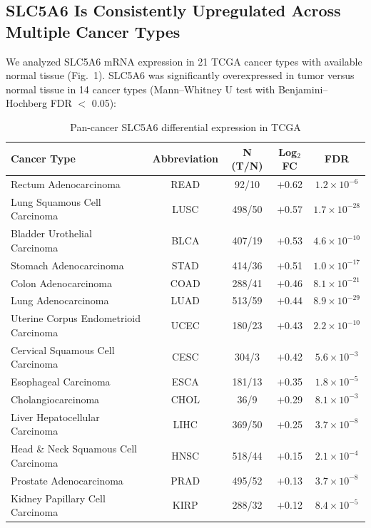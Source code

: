 \documentclass[pdflatex,sn-nature]{sn-jnl}
\begin{document}
\subsection*{SLC5A6 Is Consistently Upregulated Across Multiple Cancer Types}

We analyzed SLC5A6 mRNA expression in 21 TCGA cancer types with available normal tissue (Fig.~1). SLC5A6 was significantly overexpressed in tumor versus normal tissue in 14 cancer types (Mann--Whitney U test with Benjamini--Hochberg FDR $<$ 0.05):

\begin{table}[t]
\centering
\caption{Pan-cancer SLC5A6 differential expression in TCGA}
\label{tab:expression}
\begin{tabular}{lcccc}
\toprule
Cancer Type & Abbreviation & N (T/N) & Log$_2$FC & FDR \\
\midrule
Rectum Adenocarcinoma          & READ & 92/10 & $+$0.62 & $1.2\times10^{-6}$ \\
Lung Squamous Cell Carcinoma  & LUSC & 498/50 & $+$0.57 & $1.7\times10^{-28}$ \\
Bladder Urothelial Carcinoma  & BLCA & 407/19 & $+$0.53 & $4.6\times10^{-10}$ \\
Stomach Adenocarcinoma        & STAD & 414/36 & $+$0.51 & $1.0\times10^{-17}$ \\
Colon Adenocarcinoma          & COAD & 288/41 & $+$0.46 & $8.1\times10^{-21}$ \\
Lung Adenocarcinoma           & LUAD & 513/59 & $+$0.44 & $8.9\times10^{-29}$ \\
Uterine Corpus Endometrioid Carcinoma & UCEC & 180/23 & $+$0.43 & $2.2\times10^{-10}$ \\
Cervical Squamous Cell Carcinoma & CESC & 304/3 & $+$0.42 & $5.6\times10^{-3}$ \\
Esophageal Carcinoma          & ESCA & 181/13 & $+$0.35 & $1.8\times10^{-5}$ \\
Cholangiocarcinoma           & CHOL & 36/9 & $+$0.29 & $8.1\times10^{-3}$ \\
Liver Hepatocellular Carcinoma & LIHC & 369/50 & $+$0.25 & $3.7\times10^{-8}$ \\
Head \& Neck Squamous Cell Carcinoma & HNSC & 518/44 & $+$0.15 & $2.1\times10^{-4}$ \\
Prostate Adenocarcinoma        & PRAD & 495/52 & $+$0.13 & $3.7\times10^{-8}$ \\
Kidney Papillary Cell Carcinoma & KIRP & 288/32 & $+$0.12 & $8.4\times10^{-5}$ \\
\bottomrule
\end{tabular}
\end{table}
\end{document}
